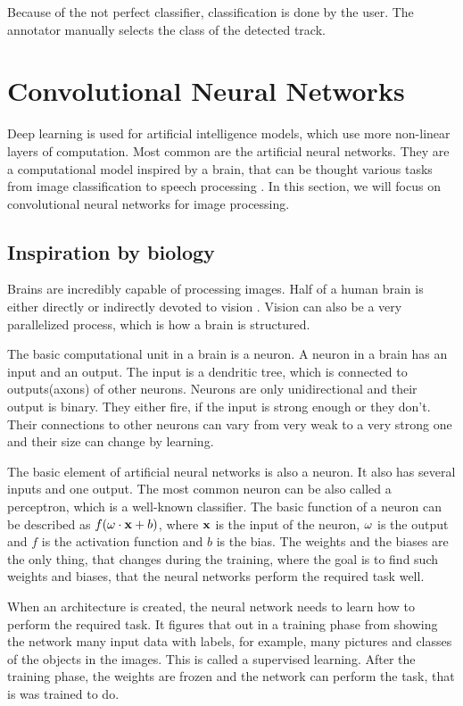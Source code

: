 \documentclass[a4paper,11pt,titlepage,twoside]{article}
\numberwithin{figure}{section}
\begin{document}
Because of the not perfect classifier, classification is done by the user. The annotator manually selects the class of the detected track.


\clearpage
\section{Convolutional Neural Networks}

Deep learning is used for artificial intelligence models, which use more non-linear layers of computation. Most common are the artificial neural networks. They are a computational model inspired by a brain, that can be thought various tasks from image classification \cite{szegedy2015going} to speech processing \cite{graves2013speech}. In this section, we will focus on convolutional neural networks for image processing.

\subsection{Inspiration by biology}
Brains are incredibly capable of processing images. Half of a human brain is either directly or indirectly devoted to vision \cite{mit-vision}. Vision can also be a very parallelized process, which is how a brain is structured.

The basic computational unit in a brain is a neuron. A neuron in a brain has an input and an output. The input is a dendritic tree, which is connected to outputs(axons) of other neurons. Neurons are only unidirectional and their output is binary. They either fire, if the input is strong enough or they don't. Their connections to other neurons can vary from very weak to a very strong one and their size can change by learning.

The basic element of artificial neural networks is also a neuron. It also has several inputs and one output. The most common neuron can be also called a perceptron\cite{rosenblatt1958perceptron}, which is a well-known classifier. The basic function of a neuron can be described as $f(\bold{\omega} \cdot \bold{x} + b)$, where $\bold{x}$ is the input of the neuron, $\bold{\omega}$ is the output and $f$ is the activation function and $b$ is the bias. The weights and the biases are the only thing, that changes during the training, where the goal is to find such weights and biases, that the neural networks perform the required task well.

When an architecture is created, the neural network needs to learn how to perform the required task. It figures that out in a training phase from showing the network many input data with labels, for example, many pictures and classes of the objects in the images. This is called a supervised learning. After the training phase, the weights are frozen and the network can perform the task, that is was trained to do.
\end{document}
